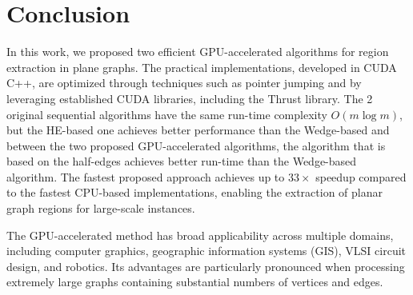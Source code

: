 \section{Conclusion}
In this work, we proposed two efficient GPU-accelerated algorithms for region extraction in plane graphs. The practical implementations, developed in CUDA C++, are optimized through techniques such as pointer jumping and by leveraging established CUDA libraries, including the Thrust library. The 2 original sequential algorithms have the same run-time complexity $O(m \log m)$, but the HE-based one achieves better performance than the Wedge-based and between the two proposed GPU-accelerated algorithms, the algorithm that is based on the half-edges achieves better run-time than the Wedge-based algorithm. The fastest proposed approach achieves up to $33\times$ speedup compared to the fastest CPU-based implementations, enabling the extraction of planar graph regions for large-scale instances.

The GPU-accelerated method has broad applicability across multiple domains, including computer graphics, geographic information systems (GIS), VLSI circuit design, and robotics. Its advantages are particularly pronounced when processing extremely large graphs containing substantial numbers of vertices and edges.
